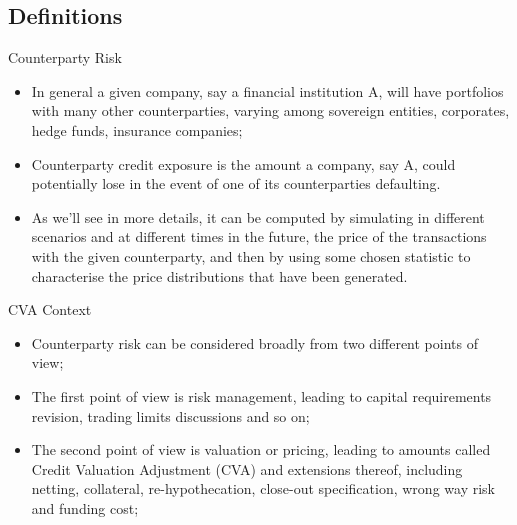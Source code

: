 \documentclass[11pt]{beamer}
\begin{document}
\subsection{Definitions}
\begin{frame}{Counterparty Risk}
\begin{itemize}
\item In general a given company, say a financial institution A, will have portfolios
with many other counterparties, varying among sovereign entities, corporates, hedge
funds, insurance companies;
\item Counterparty credit exposure is the amount a company, say A, could potentially
lose in the event of one of its counterparties defaulting. 
\item As we'll see in more details, it can be computed by simulating
in different scenarios and at different times in the future, the price of the transactions with the given counterparty, and then by using some chosen statistic to
characterise the price distributions that have been generated.
\end{itemize}
\end{frame}
\begin{frame}{CVA Context}
\begin{itemize}
\item Counterparty risk can be considered broadly from two different points of view;
\item The first point of view is risk management, leading to capital requirements revision, trading limits discussions and so on;
\item The second point of view is valuation or pricing, leading to amounts called Credit Valuation Adjustment (CVA) and extensions thereof, including netting, collateral, re-hypothecation, close-out specification, wrong way risk and funding cost;
\end{itemize}
\end{frame}
\end{document}
